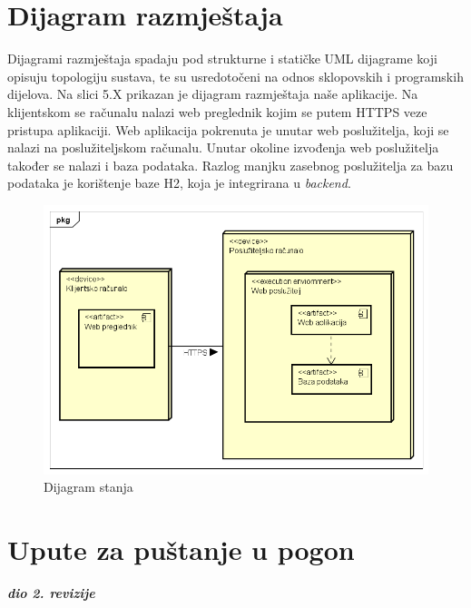 			\eject 
		
		
		\section{Dijagram razmještaja}
			
			\text Dijagrami razmještaja spadaju pod strukturne i statičke UML dijagrame koji opisuju topologiju sustava, te su usredotočeni na odnos sklopovskih i programskih dijelova. Na slici 5.X prikazan je dijagram razmještaja naše aplikacije. Na klijentskom se računalu nalazi web preglednik kojim se putem HTTPS veze pristupa aplikaciji. Web aplikacija pokrenuta je unutar web poslužitelja, koji se nalazi na poslužiteljskom računalu. Unutar okoline izvođenja web poslužitelja također se nalazi i baza podataka. Razlog manjku zasebnog poslužitelja za bazu podataka je korištenje baze H2, koja je integrirana u \textit{backend}.
			
			\begin{figure}[H]
				\includegraphics[scale=0.7]{dijagrami/dijrazm1.PNG} %
				\centering
				\caption{Dijagram stanja}
				\label{fig:dijstanj1}
			\end{figure}
			
			\eject 
		
		\section{Upute za puštanje u pogon}
		
			\textbf{\textit{dio 2. revizije}}\\
		
